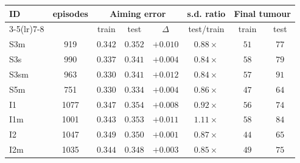 \begin{tabular}{lccccccc}
  \toprule
  \textbf{ID} & \textbf{episodes}
  & \multicolumn{3}{c}{\textbf{Aiming error}}
  & \textbf{s.d. ratio}
  & \multicolumn{2}{c}{\textbf{Final tumour}} \\
  \cmidrule(lr){3-5}\cmidrule(lr){7-8}
  & & train & test & $\Delta$ & test/train & train & test \\
  \midrule
  S3m & 919 & $0.342$ & $0.352$ & $+0.010$ & $0.88\times$ & $51$ & $77$ \\
  S3s & 990 & $0.337$ & $0.341$ & $+0.004$ & $0.84\times$ & $58$ & $79$ \\
  S3sm & 963 & $0.330$ & $0.341$ & $+0.012$ & $0.84\times$ & $57$ & $91$ \\
  S5m & 751 & $0.330$ & $0.334$ & $+0.004$ & $0.86\times$ & $47$ & $64$ \\
  \midrule
  I1 & 1077 & $0.347$ & $0.354$ & $+0.008$ & $0.92\times$ & $56$ & $74$ \\
  I1m & 1001 & $0.343$ & $0.353$ & $+0.011$ & $1.11\times$ & $58$ & $84$ \\
  I2 & 1047 & $0.349$ & $0.350$ & $+0.001$ & $0.87\times$ & $44$ & $65$ \\
  I2m & 1035 & $0.344$ & $0.348$ & $+0.003$ & $0.85\times$ & $49$ & $75$ \\
  \bottomrule
\end{tabular}
